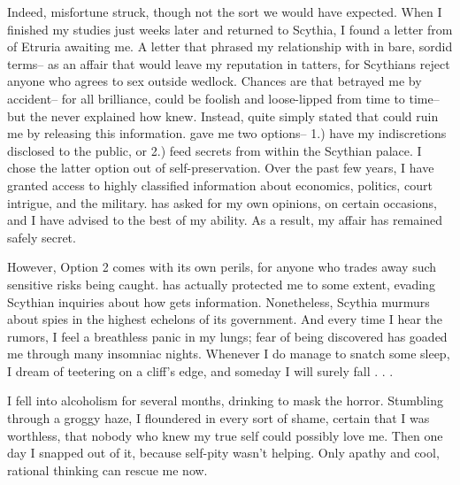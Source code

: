 \documentclass[char]{Kos}
\begin{document}
Indeed, misfortune struck, though not the sort we would have expected. When I finished my studies just weeks later and returned to Scythia, I found a letter from \cEtruriaKing{\Monarch} \cEtruriaKing{} of Etruria awaiting me. A letter that phrased my relationship with \cPoet{} in bare, sordid terms-- as an affair that would leave my reputation in tatters, for Scythians reject anyone who agrees to sex outside wedlock. Chances are that \cPoet{} betrayed me by accident-- for all \cPoet{\their} brilliance, \cPoet{\they} could be foolish and loose-lipped from time to time-- but the \cEtruriaKing{\monarch} never explained how \cEtruriaKing{\they} knew. Instead, \cEtruriaKing{\they} quite simply stated that \cEtruriaKing{\they} could ruin me by releasing this information. \cEtruriaKing{\They} gave me two options-- 1.) have my indiscretions disclosed to the public, or 2.) feed \cEtruriaKing{\them} secrets from within the Scythian palace. I chose the latter option out of self-preservation. Over the past few years, I have granted \cEtruriaKing{\them} access to highly classified information about economics, politics, court intrigue, and the military. \cEtruriaKing{\They} has asked for my own opinions, on certain occasions, and I have advised \cEtruriaKing{\them} to the best of my ability. As a result, my affair has remained safely secret. 

However, Option 2 comes with its own perils, for anyone who trades away such sensitive risks being caught. \cEtruriaKing{}  has actually protected me to some extent, evading Scythian inquiries about how \cEtruriaKing{\they} gets \cEtruriaKing{\their} information. Nonetheless, Scythia murmurs about spies in the highest echelons of its government. And every time I hear the rumors, I feel a breathless panic in my lungs; fear of being discovered has goaded me through many insomniac nights. Whenever I do manage to snatch some sleep, I dream of teetering on a cliff's edge, and someday I will surely fall . . .

I fell into alcoholism for several months, drinking to mask the horror. Stumbling through a groggy haze, I floundered in every sort of shame, certain that I was worthless, that nobody who knew my true self could possibly love me. Then one day I snapped out of it, because self-pity wasn't helping. Only apathy and cool, rational thinking can rescue me now.
\end{document}
